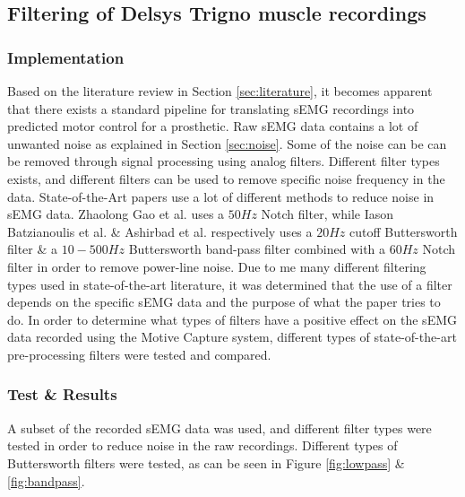 \documentclass[../main.tex]{subfiles}
\begin{document}
\subsection{Filtering of Delsys Trigno muscle recordings}

\subsubsection{Implementation}

Based on the literature review in Section \ref{sec:literature}, it becomes apparent that there exists a standard pipeline for translating sEMG recordings into predicted motor control for a prosthetic.
Raw sEMG data contains a lot of unwanted noise as explained in Section \ref{sec:noise}.
Some of the noise can be can be removed through signal processing using analog filters.
Different filter types exists, and different filters can be used to remove specific noise frequency in the data. 
State-of-the-Art papers use a lot of different methods to reduce noise in sEMG data.
Zhaolong Gao et al. \cite{Zhaolong2021} uses a $50Hz$ Notch filter, while Iason Batzianoulis et al. \cite{Batzianoulis2018} \& Ashirbad et al. \cite{ashirbad2022} respectively uses a $20Hz$ cutoff Buttersworth filter \& a $10-500Hz$  Buttersworth band-pass filter combined with a $60Hz$ Notch filter in order to remove power-line noise.
Due to me many different filtering types used in state-of-the-art literature, it was determined that the use of a filter depends on the specific sEMG data and the purpose of what the paper tries to do.
In order to determine what types of filters have a positive effect on the sEMG data recorded using the Motive Capture system, different types of state-of-the-art pre-processing filters were tested and compared.


\subsubsection{Test \& Results}

A subset of the recorded sEMG data was used, and different filter types were tested in order to reduce noise in the raw recordings.
Different types of Buttersworth filters were tested, as can be seen in Figure \ref{fig:lowpass} \& \ref{fig:bandpass}.
\end{document}
